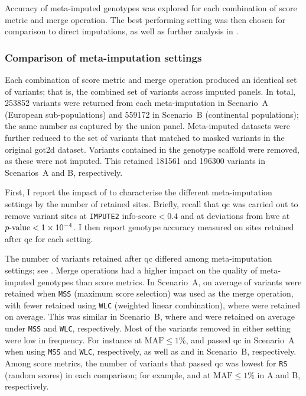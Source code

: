 Accuracy of meta-imputed genotypes was explored for each combination of score metric and merge operation.
The best performing setting was then chosen for comparison to direct imputations, as well as further analysis in .

\subsubsection{Comparison of meta-imputation settings}

Each combination of score metric and merge operation produced an identical set of variants; that is, the combined set of variants across imputed panels.
In total, \num{253852} variants were returned from each meta-imputation in Scenario~A (European sub-populations) and \num{559172} in Scenario~B (continental populations); \ie the same number as captured by the union panel.
Meta-imputed datasets were further reduced to the set of variants that matched to masked variants in the original \gls{got2d} dataset.
Variants contained in the genotype scaffold were removed, as these were not imputed.
This retained \num{181561} and \num{196300} variants in Scenarios~A and B, respectively.

First, I report the impact of  to characterise the different meta-imputation settings by the number of retained sites.
Briefly, recall that \gls{qc} was carried out to remove variant sites at \texttt{IMPUTE2} ${\mbox{info-score}<0.4}$ and at deviations from \gls{hwe} at ${\mbox{$p$-value}<\num{1e-4}}$.
I then report genotype accuracy measured on sites retained after \gls{qc} for each setting.


%

%

The number of variants retained after \gls{qc} differed among meta-imputation settings; see .
Merge operations had a higher impact on the quality of meta-imputed genotypes than score metrics.
In Scenario~A, on average  of variants were retained when \texttt{MSS} (maximum score selection) was used as the merge operation, with fewer retained using \texttt{WLC} (weighted linear combination), where  were retained on average.
This was similar in Scenario~B, where  and 
were retained on average under \texttt{MSS} and \texttt{WLC}, respectively.
Most of the variants removed in either setting were low in frequency.
For instance at ${\text{MAF} \leq 1\%}$,
 and
 passed \gls{qc} in Scenario~A
when using \texttt{MSS} and \texttt{WLC}, respectively, as well as
 and
 in Scenario~B, respectively.
Among score metrics, the number of variants that passed \gls{qc} was lowest for \texttt{RS} (random scores) in each comparison; for example,  and  at ${\text{MAF} \leq 1\%}$ in A and B, respectively.

